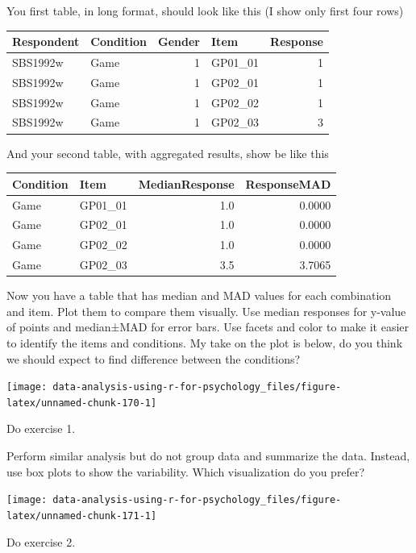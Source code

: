 \documentclass[
]{book}
\begin{document}
You first table, in long format, should look like this (I show only first four rows)

\begin{tabular}{l|l|r|l|r}
\hline
Respondent & Condition & Gender & Item & Response\\
\hline
SBS1992w & Game & 1 & GP01\_01 & 1\\
\hline
SBS1992w & Game & 1 & GP02\_01 & 1\\
\hline
SBS1992w & Game & 1 & GP02\_02 & 1\\
\hline
SBS1992w & Game & 1 & GP02\_03 & 3\\
\hline
\end{tabular}

And your second table, with aggregated results, show be like this

\begin{tabular}{l|l|r|r}
\hline
Condition & Item & MedianResponse & ResponseMAD\\
\hline
Game & GP01\_01 & 1.0 & 0.0000\\
\hline
Game & GP02\_01 & 1.0 & 0.0000\\
\hline
Game & GP02\_02 & 1.0 & 0.0000\\
\hline
Game & GP02\_03 & 3.5 & 3.7065\\
\hline
\end{tabular}

Now you have a table that has median and MAD values for each combination and item. Plot them to compare them visually. Use median responses for y-value of points and median±MAD for error bars. Use facets and color to make it easier to identify the items and conditions. My take on the plot is below, do you think we should expect to find difference between the conditions?

\begin{center}\texttt{[image: data-analysis-using-r-for-psychology\_files/figure-latex/unnamed-chunk-170-1]} \end{center}

Do exercise 1.

Perform similar analysis but do not group data and summarize the data. Instead, use box plots to show the variability. Which visualization do you prefer?

\begin{center}\texttt{[image: data-analysis-using-r-for-psychology\_files/figure-latex/unnamed-chunk-171-1]} \end{center}

Do exercise 2.
\end{document}
